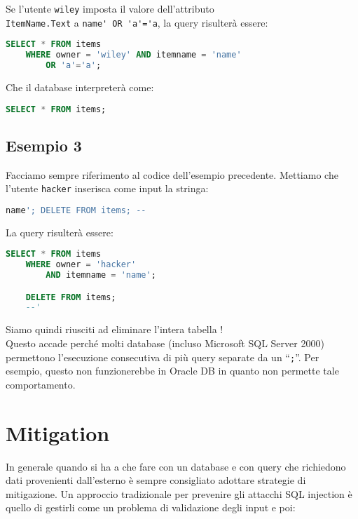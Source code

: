 Se l'utente \verb|wiley| imposta il valore dell'attributo\\
\verb|ItemName.Text| a \verb|name' OR 'a'='a|, la query risulterà essere:

\begin{lstlisting}[language=SQL]
    SELECT * FROM items
    WHERE owner = 'wiley' AND itemname = 'name'
        OR 'a'='a';
\end{lstlisting}

Che il database interpreterà come:

\begin{lstlisting}[language=SQL]
    SELECT * FROM items;
\end{lstlisting}

\subsection{Esempio 3}

Facciamo sempre riferimento al codice dell'esempio precedente.
Mettiamo che l'utente \verb|hacker| inserisca come input la stringa:

\begin{lstlisting}[language=SQL]
    name'; DELETE FROM items; --
\end{lstlisting}

La query risulterà essere:

\begin{lstlisting}[language=SQL]
    SELECT * FROM items
    WHERE owner = 'hacker'
        AND itemname = 'name';

    DELETE FROM items;
    --'
\end{lstlisting}

Siamo quindi riusciti ad eliminare l'intera tabella !\\
Questo accade perché molti database (incluso Microsoft SQL Server 2000)
permettono l'esecuzione consecutiva di più query separate da un ``\verb|;|''.
Per esempio, questo non funzionerebbe in Oracle DB in quanto non permette tale comportamento.

\newpage

\section{Mitigation}

In generale quando si ha a che fare con un database e con query che richiedono dati
provenienti dall'esterno è sempre consigliato adottare strategie di mitigazione.
Un approccio tradizionale per prevenire gli attacchi SQL injection è quello di
gestirli come un
problema di validazione degli input e poi:

